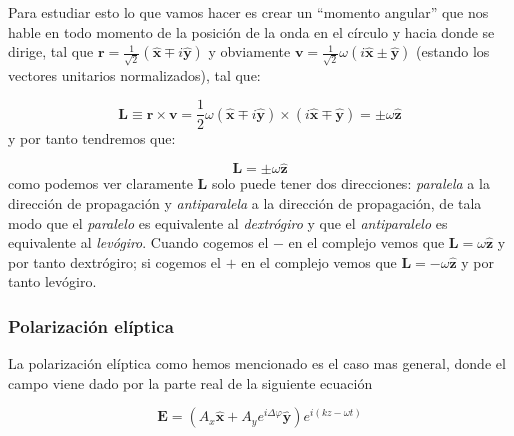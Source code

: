 \documentclass[12pt,a4paper]{article}
\newcommand{\En}{\mathbf{E}}
\newcommand{\vn}{\mathbf{v}}
\newcommand{\rn}{\mathbf{r}}
\newcommand{\Ln}{\mathbf{L}}
\newcommand{\hnz}{\hat{\mathbf{z}}}
\newcommand{\hnx}{\hat{\mathbf{x}}}
\newcommand{\hny}{\hat{\mathbf{y}}}
\numberwithin{equation}{section}
\numberwithin{figure}{section}
\begin{document}
Para estudiar esto lo que vamos hacer es crear un ``momento angular'' que nos hable en todo momento de la posición de la onda en el círculo y hacia donde se dirige, tal que $\rn =\frac{1}{\sqrt{2}} (\hnx \mp i \hny)$ y obviamente $\vn = \frac{1}{\sqrt{2}} \omega(i \hnx \pm \hny)$ (estando los vectores unitarios normalizados), tal que: 

$$ \Ln  \equiv \rn \times \vn = \frac{1}{2} \omega (\hnx \mp i \hny ) \times (i \hnx \mp \hny) = \pm \omega \hnz $$
y por tanto tendremos que:

\begin{equation}
\Ln = \pm \omega \hnz
\end{equation}
como podemos ver claramente $\Ln$ solo puede tener dos direcciones: \textit{paralela} a la dirección de propagación y \textit{antiparalela} a la dirección de propagación, de tala modo que el \textit{paralelo} es equivalente al \textit{dextrógiro} y que el \textit{antiparalelo} es equivalente al \textit{levógiro}. Cuando cogemos el $-$ en el complejo vemos que $\Ln = \omega \hnz$ y por tanto dextrógiro; si cogemos el $+$ en el complejo vemos que $\Ln = - \omega \hnz$ y por tanto levógiro.


\subsubsection{Polarización elíptica}

La polarización elíptica como hemos mencionado es el caso mas general, donde el campo viene dado por la parte real de la siguiente ecuación

\begin{equation}
\En = (A_x\hnx+A_y e^{i \Delta \varphi}\hny) e^{i (kz-\omega t)}
\end{equation}
\end{document}
